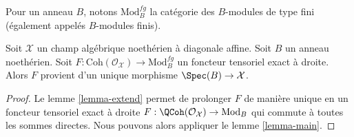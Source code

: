\noindent
Pour un anneau $B$, notons $\text{Mod}^{fg}_B$ la catégorie des
$B$-modules de type fini (également appelés $B$-modules finis).

\begin{theorem}
\label{theorem-main}
Soit $\mathcal{X}$ un champ algébrique noethérien à diagonale affine.
Soit $B$ un anneau noethérien.
Soit $F : \text{Coh}(\mathcal{O}_\mathcal{X}) \to \text{Mod}^{fg}_B$
un foncteur tensoriel exact à droite.
Alors $F$ provient d'un unique morphisme $\Spec(B) \to \mathcal{X}$.
\end{theorem}

\begin{proof}
Le lemme \ref{lemma-extend}
permet de prolonger $F$ de manière unique en un foncteur tensoriel exact à droite
$F : \QCoh(\mathcal{O}_\mathcal{X}) \to \text{Mod}_B$
qui commute à toutes les sommes directes. Nous pouvons alors appliquer
le lemme \ref{lemma-main}.
\end{proof}
















